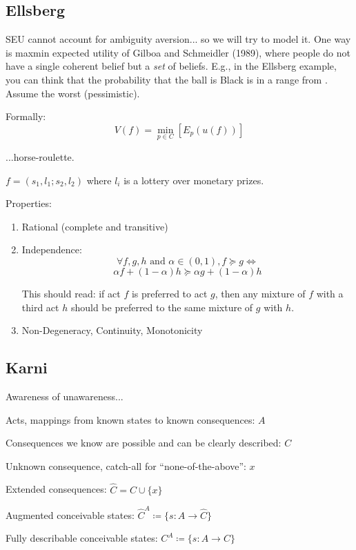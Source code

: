 \documentclass[letterpaper, 12pt]{article}
\begin{document}
\subsection{Ellsberg}
\label{subsec:ellsberg}

SEU cannot account for ambiguity aversion... so we will try to model it. One way
is maxmin expected utility of Gilboa and Schmeidler (1989), where people do not
have a single coherent belief but a \emph{set} of beliefs. E.g., in the Ellsberg
example, you can think that the probability that the ball is Black is in a range
from . Assume the worst (pessimistic).

Formally:
\[V(f) = \min_{p \in C} [E_p(u(f))]\]

...horse-roulette.

\(f = (s_1, l_1; s_2, l_2)\) where $l_i$ is a lottery over monetary prizes.

Properties:
\begin{enumerate}
\item Rational (complete and transitive)
\item Independence:
  \[\forall f,g,h \text{ and } \alpha \in (0,1), f \succeq g \iff\]
  \[\alpha f + (1-\alpha)h \succeq \alpha g + (1-\alpha)h\]

  This should read: if act $f$ is preferred to act $g$, then any mixture of $f$ with a
  third act $h$ should be preferred to the same mixture of $g$ with $h$.
  
\item Non-Degeneracy, Continuity, Monotonicity
\end{enumerate}

\subsection{Karni}
\label{subsec:karni}

Awareness of unawareness...

Acts, mappings from known states to known consequences: $A$

Consequences we know are possible and can be clearly described: $C$

Unknown consequence, catch-all for ``none-of-the-above'': $x$

Extended consequences: $\hat{C} = C \cup \{x\}$

Augmented conceivable states: $\hat{C}^A \coloneq \{s : A \rightarrow \hat{C}\}$

Fully describable conceivable states: $C^A \coloneq \{s : A \rightarrow C\}$
\end{document}
